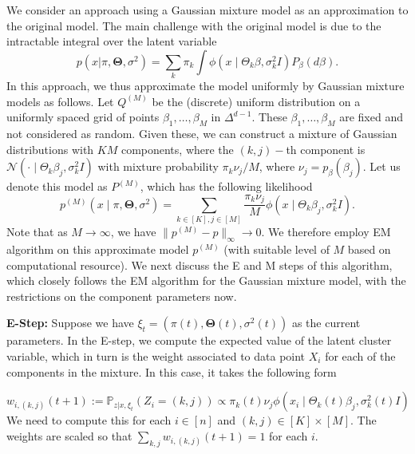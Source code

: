 \documentclass[bj,authoryear]{imsart}
\theoremstyle{plain}
\theoremstyle{remark}
\def\bTheta{{\boldsymbol\Theta}}
\def\bbP{\mathbb{P}}
\def\cN{\mathcal{N}}
\def\bTheta{\boldsymbol{\Theta}}
\begin{document}
We consider an approach using a Gaussian mixture model as an approximation to the original model. The main challenge with the original model is due to the intractable integral over the latent variable
$$p(x|\pi,\bTheta,\sigma^2) = \sum_k \pi_k \int \phi(x\mid \Theta_k\beta, \sigma_k^2 I) P_{\beta}(d\beta).$$
In this approach, we thus approximate the model uniformly by Gaussian mixture models as follows. Let $Q^{(M)}$ be the (discrete) uniform distribution on a uniformly spaced grid of points $\beta_1,\dots,\beta_M$ in $\Delta^{d-1}$. These $\beta_1,\dots,\beta_M$ are fixed and not considered as random. Given these, we can construct a mixture of Gaussian distributions with $KM$ components, where the $(k,j)-$th component is $\cN(\cdot\mid \Theta_k\beta_j,\sigma_k^2 I)$ with mixture probability $\pi_k \nu_j/M$, where $\nu_j=p_{\beta}(\beta_j)$. Let us denote this model as $P^{(M)}$, which has the following likelihood
\begin{equation}\label{eq:em_approx}
    p^{(M)}(x\mid \pi,\bTheta,\sigma^2) = \sum_{k\in[K], j\in[M]} \frac{\pi_k \nu_j}{M} \phi(x\mid \Theta_k\beta_j,\sigma_k^2 I).
\end{equation}
Note that as $M\to\infty$, we have $\|p^{(M)} - p\|_{\infty} \to 0$. We therefore employ EM algorithm on this approximate model $p^{(M)}$ (with suitable level of $M$ based on computational resource). We next discuss the E and M steps of this algorithm, which closely follows the EM algorithm for the Gaussian mixture model, with the restrictions on the component parameters now.

\vspace{1em}
\textbf{E-Step:} Suppose we have $\xi_t=(\pi{(t)},\bTheta{(t)}, \sigma^2(t))$ as the current parameters. In the E-step, we compute the expected value of the latent cluster variable, which in turn is the weight associated to data point $X_i$ for each of the components in the mixture. In this case, it takes the following form

\begin{equation}\label{eq:E-step approx model}
    w_{i,(k,j)}(t+1) := \bbP_{z|x,\xi_t}(Z_i=(k,j)) \propto \pi_k(t)\nu_j \phi(x_i\mid \Theta_k(t)\beta_j, \sigma_k^2(t) I)
\end{equation}
We need to compute this for each $i\in[n]$ and $(k,j)\in [K]\times [M]$. The weights are scaled so that $\sum_{k,j} w_{i,(k,j)}(t+1) = 1$ for each $i$.
\end{document}
